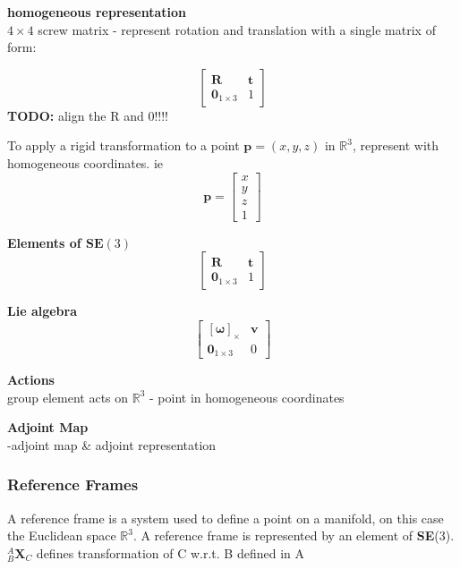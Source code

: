 		\textbf{homogeneous representation}\\
		$4 \times 4$ screw matrix - represent rotation and translation with a single matrix of form:
		
		\begin{equation}
				\begin{bmatrix}
				  \mathbf{R}	&	\mathbf{t} \\
				  \textbf{0}_{1 \times 3}		& 	1 
				\end{bmatrix}
		\end{equation}
		\textbf{TODO:} align the R and 0!!!!

		To apply a rigid transformation to a point $\textbf{p} = (x,y,z) $ in $\mathbb{R}^3$, represent with homogeneous coordinates. ie
		\begin{equation}
		\mathbf{p} = 
		\begin{bmatrix}
				  x	\\
				  y	\\
				  z	\\
				  1	
		\end{bmatrix}
		\end{equation}
	
		\textbf{Elements of $\textbf{SE}(3)$}
		\begin{equation}
			\begin{bmatrix}
				\mathbf{R}	&	\mathbf{t} \\
			  	\textbf{0}_{1 \times 3}		& 	1 
			\end{bmatrix}
		\end{equation}
		
		\textbf{Lie algebra}
		\begin{equation}
			\begin{bmatrix}
				  [\mathbf{\omega}]_\times	&  \mathbf{v}\\
				  \textbf{0}_{1 \times 3} & 0						  
			\end{bmatrix}
		\end{equation}
		
		\textbf{Actions}\\
		group element acts on $\mathbb{R}^3$ - point in homogeneous coordinates
		
		\textbf{Adjoint Map}\\
		-adjoint map \& adjoint representation
		
	\subsubsection{Reference Frames}
		A reference frame is a system used to define a point on a manifold, on this case the Euclidean space $\mathbb{R}^3$. A reference frame is represented by an element of \textbf{SE}(3).\\
		$^{A}_{B}\mathbf{X}^{}_{C}$ defines transformation of C w.r.t. B defined in A
		
